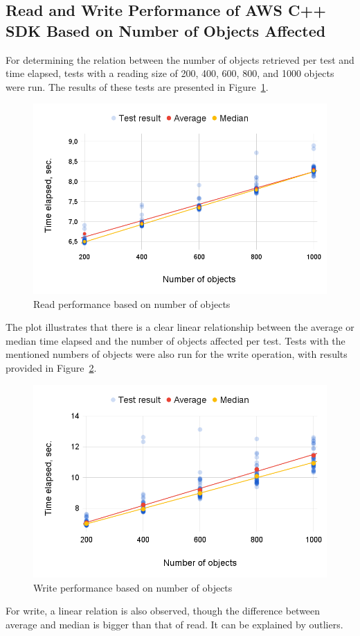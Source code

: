 \documentclass[conference]{IEEEtran}
\begin{document}
\subsection{Read and Write Performance of AWS C++ SDK Based on Number of Objects Affected}
For determining the relation between the number of objects retrieved per test and time elapsed, tests with a reading size of 200, 400, 600, 800, and 1000 objects were run. The results of these tests are presented in Figure~\ref{fig:read-objects-number}. 
\begin{figure}
    \centering
    \includegraphics[width=0.9\linewidth]{read_nod.png}
    \caption{Read performance based on number of objects}
    \label{fig:read-objects-number}
\end{figure}
The plot illustrates that there is a clear linear relationship between the average or median time elapsed and the number of objects affected per test. Tests with the mentioned numbers of objects were also run for the write operation, with results provided in Figure~\ref{fig:write-objects-number}.
\begin{figure}
    \centering
    \includegraphics[width=0.9\linewidth]{write_nod.png}
    \caption{Write performance based on number of objects}
    \label{fig:write-objects-number}
\end{figure}
For write, a linear relation is also observed, though the difference between average and median is bigger than that of read. It can be explained by outliers. 
\end{document}
